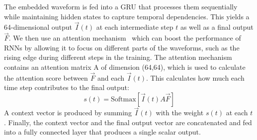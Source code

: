 The embedded waveform is fed into a GRU that processes them sequentially while maintaining hidden states to capture temporal dependencies. This yields a 64-dimensional output $\vec{I}(t)$ at each intermediate step $t$ as well as a final output  $\vec{F}$. We then use an attention mechanism~\cite{attention} which can boost the performance of RNNs by allowing it to focus on different parts of the waveforms, such as the rising edge during different steps in the training. The attention mechanism contains an attention matrix A of dimension (64,64), which is used to calculate the attention score between $\vec{F}$ and each $\vec{I}(t)$. This calculates how much each time step contributes to the final output:
\begin{equation}
    s(t) = \mathrm{Softmax}[\vec{I}(t) A \vec{F}]
\end{equation}
A context vector is produced by summing $\vec{I}(t)$ with the weight $s(t)$ at each $t$. Finally, the context vector and the final output vector are concatenated and fed into a fully connected layer that produces a single scalar output.

